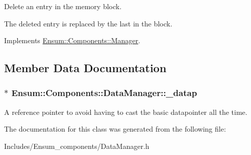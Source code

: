 Delete an entry in the memory block. 

The deleted entry is replaced by the last in the block. 

Implements \hyperlink{class_ensum_1_1_components_1_1_manager_a5ba85395802e942ed8904ca18951e6b0}{Ensum\+::\+Components\+::\+Manager}.



\subsection{Member Data Documentation}
\subsubsection[{\texorpdfstring{\+\_\+datap}{_datap}}]{$\ast$ Ensum\+::\+Components\+::\+Data\+Manager\+::\+\_\+datap\hspace{0.3cm}{\ttfamily [private]}}\hypertarget{class_ensum_1_1_components_1_1_data_manager_a03fb52e21fcfdf08e9dd11a71da74385}{}\label{class_ensum_1_1_components_1_1_data_manager_a03fb52e21fcfdf08e9dd11a71da74385}
A reference pointer to avoid having to cast the basic datapointer all the time. 

The documentation for this class was generated from the following file\+:\begin{DoxyCompactItemize}
\item 
Includes/\+Ensum\+\_\+components/Data\+Manager.\+h\end{DoxyCompactItemize}
